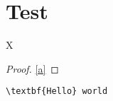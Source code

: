 \documentclass{IEEEtran}
\begin{document}
\section{Test}
\begin{theoremrep}
  \label{a}
  X
\end{theoremrep}

\begin{proof}
  \ref{a}
\end{proof}

\begin{Verbatim}
\textbf{Hello} world
\end{Verbatim}
\end{document}
